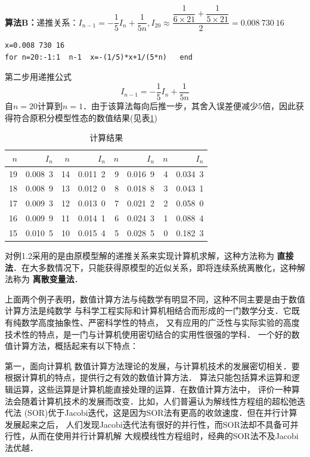{\bf
算法B：}递推关系：$I_{n-1}=-\dfrac{1}{5}I_n+\dfrac{1}{5n},I_{20}\approx\dfrac{\dfrac{1}{6\times21}+\dfrac{1}{5\times21}}{2}=0.008\ 730\ 16$
\begin{colorboxed}[oval=true,boxcolor=darkblue,bgcolor=white]
\begin{verbatim}
x=0.008 730 16
for n=20:-1:1  n-1  x=-(1/5)*x+1/(5*n)   end
\end{verbatim}
\end{colorboxed}

第二步用递推公式
\begin{equation}\label{equ1.2}
    I_{n-1}=-\frac{1}{5}I_n+\frac{1}{5n}
\end{equation}
自$n=20$计算到$n=1$．由于该算法每向后推一步，其舍入误差便减少5倍，因此获得符合原积分模型性态的数值结果(见表\ref{tab1-2})
\begin{table}[h]\begin{center}\color{darkblue}\caption{计算结果}\color{black}\label{tab1-2}
{\footnotesize
\begin{tabular}{r|r||r|r||r|r||r|r}\arrayrulecolor{darkblue}\hline\rowcolor{lightblue}
  $n$&$I_n$&$n$&$I_n$&$n$&$I_n$&$n$&$I_n$\\\hline
  19&0.008\ 3&14&0.011\ 2&9&0.016\ 9&4&0.034\ 3\\
  18&0.008\ 9&13&0.012\ 0&8&0.018\ 8&3&0.043\ 1\\
  17&0.009\ 3&12&0.013\ 0&7&0.021\ 2&2&0.058\ 0\\
  16&0.009\ 9&11&0.014\ 1&6&0.024\ 3&1&0.088\ 4\\
  15&0.010\ 5&10&0.015\ 4&5&0.028\ 5&0&0.182\ 3\\\hline
 \end{tabular}}\end{center}\end{table}
对例1.2采用的是由原模型解的递推关系来实现计算机求解，这种方法称为{\bf
直接法}．在大多数情况下，只能获得原模型的近似关系，即将连续系统离散化，这种解法称为{\bf
离散变量法}．

上面两个例子表明，数值计算方法与纯数学有明显不同，这种不同主要是由于数值计算方法是纯数学
与科学工程实际和计算机相结合而形成的一门数学分支．它既有纯数学高度抽象性、严密科学性的特点，
又有应用的广泛性与实际实验的高度技术性的特点，是一门与计算机使用密切结合的实用性很强的学科．
一个好的数值计算方法，概括起来有以下特点：

第一，面向计算机
数值计算方法理论的发展，与计算机技术的发展密切相关．要根据计算机的特点，提供行之有效的数值计算方法．
算法只能包括算术运算和逻辑运算，这些运算是计算机能直接处理的运算．在数值计算方法中，
评价一种算法会随着计算机技术的发展而改变．比如，人们普遍认为解线性方程组的超松弛迭代法
(SOR)优于Jacobi迭代，这是因为SOR法有更高的收敛速度．但在并行计算发展起来之后，
人们发现Jacobi迭代法有很好的并行性，而SOR法却不具备可并行性，从而在使用并行计算机解
大规模线性方程组时，经典的SOR法不及Jacobi法优越．

